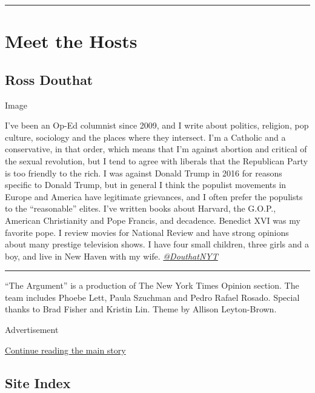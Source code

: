 \begin{center}\rule{0.5\linewidth}{\linethickness}\end{center}

\hypertarget{meet-the-hosts}{%
\section{Meet the Hosts}\label{meet-the-hosts}}

\hypertarget{ross-douthat}{%
\subsection{Ross Douthat}\label{ross-douthat}}

Image

I've been an Op-Ed columnist since 2009, and I write about politics,
religion, pop culture, sociology and the places where they intersect.
I'm a Catholic and a conservative, in that order, which means that I'm
against abortion and critical of the sexual revolution, but I tend to
agree with liberals that the Republican Party is too friendly to the
rich. I was against Donald Trump in 2016 for reasons specific to Donald
Trump, but in general I think the populist movements in Europe and
America have legitimate grievances, and I often prefer the populists to
the ``reasonable'' elites. I've written books about Harvard, the G.O.P.,
American Christianity and Pope Francis, and decadence. Benedict XVI was
my favorite pope. I review movies for National Review and have strong
opinions about many prestige television shows. I have four small
children, three girls and a boy, and live in New Haven with my wife.
\href{https://twitter.com/DouthatNYT}{\emph{@DouthatNYT}}

\begin{center}\rule{0.5\linewidth}{\linethickness}\end{center}

``The Argument'' is a production of The New York Times Opinion section.
The team includes Phoebe Lett, Paula Szuchman and Pedro Rafael Rosado.
Special thanks to Brad Fisher and Kristin Lin. Theme by Allison
Leyton-Brown.

Advertisement

\protect\hyperlink{after-bottom}{Continue reading the main story}

\hypertarget{site-index}{%
\subsection{Site Index}\label{site-index}}

